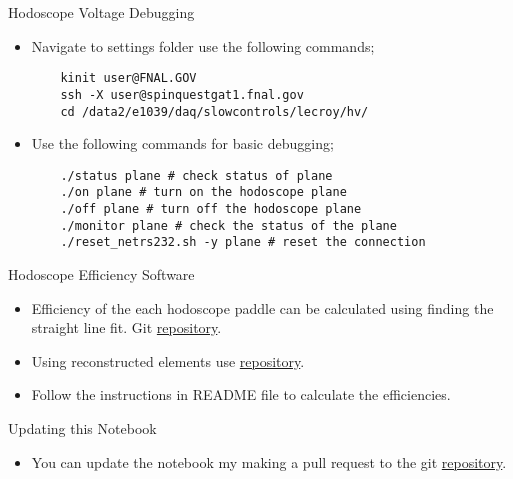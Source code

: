 \documentclass[10pt, xcolor={dvipsnames}, aspectratio = 169, sans,mathserif]{beamer}
\begin{document}
\begin{frame}[fragile]{Hodoscope Voltage Debugging}

\begin{itemize}

    \item Navigate to settings folder use the following commands;

    \begin{verbatim}
    kinit user@FNAL.GOV
    ssh -X user@spinquestgat1.fnal.gov
    cd /data2/e1039/daq/slowcontrols/lecroy/hv/
    \end{verbatim}

    \item Use the following commands for basic debugging;

    \begin{verbatim}
    ./status plane # check status of plane
    ./on plane # turn on the hodoscope plane
    ./off plane # turn off the hodoscope plane
    ./monitor plane # check the status of the plane
    ./reset_netrs232.sh -y plane # reset the connection
    \end{verbatim}

\end{itemize}

\end{frame}

\begin{frame}{Hodoscope Efficiency Software}

\begin{itemize}

    \item Efficiency of the each hodoscope paddle can be calculated using finding the straight line fit. Git \href{https://github.com/forhadnmsu/e1039-analysis/tree/hodo-hvScan/AnaRealDst}{repository}.

    \item Using reconstructed elements use \href{https://github.com/forhadnmsu/e1039-analysis/tree/ktracker-eff/AnaRealDst}{repository}.

    \item Follow the instructions in README file to calculate the efficiencies.

\end{itemize}

\end{frame}

\begin{frame}{Updating this Notebook}

\begin{itemize}

    \item You can update the notebook my making a pull request to the git \href{https://github.com/dinupa1/NIM_Hodo_Handbook}{repository}.

\end{itemize}

\end{frame}
\end{document}
